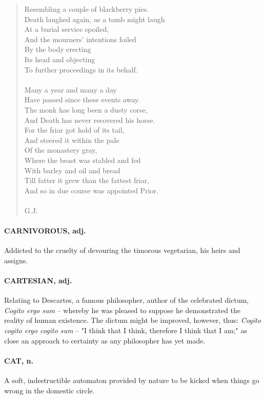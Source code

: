 \documentclass[11pt]{article}
\begin{document}
\begin{quote}
      Resembling a couple of blackberry pies. \\
  Death laughed again, as a tomb might laugh \\
      At a burial service spoiled, \\
      And the mourners' intentions foiled \\
      By the body erecting \\
      Its head and objecting \\
  To further proceedings in its behalf. \\
 \\
  Many a year and many a day \\
  Have passed since these events away. \\
  The monk has long been a dusty corse, \\
  And Death has never recovered his horse. \\
      For the friar got hold of its tail, \\
      And steered it within the pale \\
  Of the monastery gray, \\
  Where the beast was stabled and fed \\
  With barley and oil and bread \\
  Till fatter it grew than the fattest friar, \\
  And so in due course was appointed Prior. \\
 \\
G.J. \end{quote}


\paragraph{CARNIVOROUS, adj.}  Addicted to the cruelty of devouring the timorous
vegetarian, his heirs and assigns.

\paragraph{CARTESIAN, adj.}  Relating to Descartes, a famous philosopher, author
of the celebrated dictum, {\em Cogito ergo sum} -- whereby he was pleased
to suppose he demonstrated the reality of human existence.  The dictum
might be improved, however, thus:  {\em Cogito cogito ergo cogito sum} --
"I think that I think, therefore I think that I am;" as close an
approach to certainty as any philosopher has yet made.

\paragraph{CAT, n.}  A soft, indestructible automaton provided by nature to be
kicked when things go wrong in the domestic circle.
\end{document}
